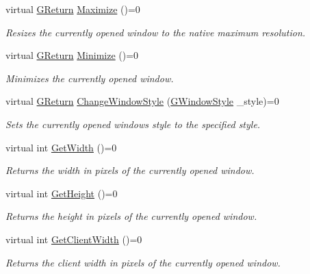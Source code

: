 \begin{DoxyCompactItemize}
virtual \hyperlink{namespaceGW_a67a839e3df7ea8a5c5686613a7a3de21}{G\+Return} \hyperlink{classGW_1_1SYSTEM_1_1GWindow_a06b5f092e742baca82a0bfc2cbaef153}{Maximize} ()=0
\begin{DoxyCompactList}\small\item\em Resizes the currently opened window to the native maximum resolution. \end{DoxyCompactList}\item 
virtual \hyperlink{namespaceGW_a67a839e3df7ea8a5c5686613a7a3de21}{G\+Return} \hyperlink{classGW_1_1SYSTEM_1_1GWindow_a2cced61a323dac10535904c3899563d8}{Minimize} ()=0
\begin{DoxyCompactList}\small\item\em Minimizes the currently opened window. \end{DoxyCompactList}\item 
virtual \hyperlink{namespaceGW_a67a839e3df7ea8a5c5686613a7a3de21}{G\+Return} \hyperlink{classGW_1_1SYSTEM_1_1GWindow_a21533c58e920d347c377ebdaa6d2b76f}{Change\+Window\+Style} (\hyperlink{namespaceGW_1_1SYSTEM_ad117891e556631f842625c348d36a071}{G\+Window\+Style} \+\_\+style)=0
\begin{DoxyCompactList}\small\item\em Sets the currently opened window\textquotesingle{}s style to the specified style. \end{DoxyCompactList}\item 
virtual int \hyperlink{classGW_1_1SYSTEM_1_1GWindow_a5afa3ef5f507b1dcb041d57280378e62}{Get\+Width} ()=0
\begin{DoxyCompactList}\small\item\em Returns the width in pixels of the currently opened window. \end{DoxyCompactList}\item 
virtual int \hyperlink{classGW_1_1SYSTEM_1_1GWindow_a159a5aca2f2a77b756591ff29574cdc9}{Get\+Height} ()=0
\begin{DoxyCompactList}\small\item\em Returns the height in pixels of the currently opened window. \end{DoxyCompactList}\item 
virtual int \hyperlink{classGW_1_1SYSTEM_1_1GWindow_a1a4bdd7bb12a39d5bbaae53f1e180d91}{Get\+Client\+Width} ()=0
\begin{DoxyCompactList}\small\item\em Returns the client width in pixels of the currently opened window. \end{DoxyCompactList}\item 

\end{DoxyCompactItemize}
